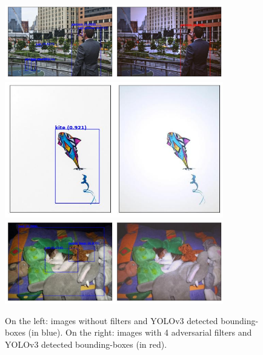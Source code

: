 \begin{figure}[h]%
    \centering
    \includegraphics[width=0.85\textwidth]{Experiments/imgs/0.8_545100.png}
    \includegraphics[width=0.85\textwidth]{Experiments/imgs/1_85665.png}
    \includegraphics[width=0.85\textwidth]{Experiments/imgs/1_434996.png}
    \caption{On the left: images without filters and YOLOv3 detected bounding-boxes (in blue). On the right: images with 4 adversarial filters and YOLOv3 detected bounding-boxes (in red).}
    \label{fig:objdet_samples}
\end{figure}

